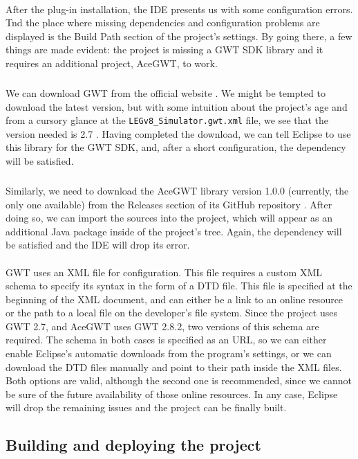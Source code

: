 \paragraph{}
After the plug-in installation, the IDE presents us with some configuration errors. Tnd the place where missing dependencies and configuration problems are displayed is the Build Path section of the project's settings. By going there, a few things are made evident: the project is missing a GWT SDK library and it requires an additional project, AceGWT, to work.
\subparagraph{}
We can download GWT from the official website \cite{gwtweb}. We might be tempted to download the latest version, but with some intuition about the project's age and from a cursory glance at the \verb|LEGv8_Simulator.gwt.xml| file, we see that the version needed is 2.7 \cite{gwt2.7web}. Having completed the download, we can tell Eclipse to use this library for the GWT SDK, and, after a short configuration, the dependency will be satisfied.
\subparagraph{}
Similarly, we need to download the AceGWT library version 1.0.0 (currently, the only one available) from the Releases section of its GitHub repository \cite{web:acegwtgit}. After doing so, we can import the sources into the project, which will appear as an additional Java package inside of the project's tree. Again, the dependency will be satisfied and the IDE will drop its error.
\paragraph{}
GWT uses an XML file for configuration. This file requires a custom XML schema to specify its syntax in the form of a DTD file. This file is specified at the beginning of the XML document, and can either be a link to an online resource or the path to a local file on the developer's file system. Since the project uses GWT 2.7, and AceGWT uses GWT 2.8.2, two versions of this schema are required. The schema in both cases is specified as an URL, so we can either enable Eclipse's automatic downloads from the program's settings, or we can download the DTD files manually and point to their path inside the XML files. Both options are valid, although the second one is recommended, since we cannot be sure of the future availability of those online resources. In any case, Eclipse will drop the remaining issues and the project can be finally built.
\subsection{Building and deploying the project}
